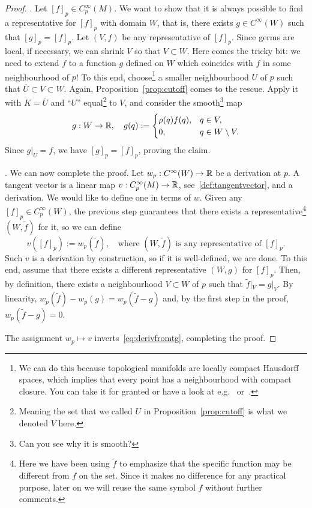 \begin{proof}
  .
  Let $[f]_p\in C_p^\infty(M)$.
  We want to show that it is always possible to find a representative for $[f]_p$ with domain $W$, that is, there exists $g\in C^\infty(W)$ such that $[g]_p = [f]_p$.
  Let $(V, f)$ be any representative of $[f]_p$.
  Since germs are local, if necessary, we can shrink $V$ so that $V\subset W$.
  Here comes the tricky bit: we need to extend $f$ to a function $g$ defined on $W$ which coincides with $f$ in some neighbourhood of $p$!
  To this end, choose\footnote{We can do this because topological manifolds are locally compact Hausdorff spaces, which implies that every point has a neighbourhood with compact closure. You can take it for granted or have a look at e.g.~\cite[Lemma 4.65]{book:lee:topology} or~\cite{book:munkres:topology}.} a smaller neighbourhood $U$ of $p$ such that $\overline{U}\subset V\subset W$.
  Again, Proposition~\ref{prop:cutoff} comes to the rescue. Apply it with $K=\overline{U}$ and ``$U$'' equal\footnote{Meaning the set that we called $U$ in Proposition~\ref{prop:cutoff} is what we denoted $V$ here.} to $V$, and consider the smooth\footnote{Can you see why it is smooth?} map
  \begin{equation}
    g:W\to\mathbb{R}, \quad
    g(q) := \begin{cases}
      \rho(q)f(q), & q\in V,             \\
      0,           & q \in W\setminus V.
    \end{cases}
  \end{equation}
  Since $g|_U = f$, we have $[g]_p = [f]_p$, proving the claim.

  . We can now complete the proof.
  Let $w_p:C^\infty(W) \to\mathbb{R}$ be a derivation at $p$.
  A tangent vector is a linear map $v:C_p^\infty(M)\to\mathbb{R}$, see~\eqref{def:tangentvector}, and a derivation.
  We would like to define one in terms of $w$.
Given any $[f]_p\in C_p^\infty(W)$, the previous step guarantees that there exists a representative\footnote{Here we have been using $\widetilde{f}$ to emphasize that the specific function may be different from $f$ on the set. Since it makes no difference for any practical purpose, later on we will reuse the same symbol $f$ without further comments.} $(W,\widetilde{f})$ for it, so we can define
  \begin{equation}
    v([f]_p) := w_p(\widetilde{f}), \quad\mbox{where $(W,\widetilde{f})$ is any representative of $[f]_p$}.
  \end{equation}
  Such $v$ is a derivation by construction, so if it is well-defined, we are done.
  To this end, assume that there exists a different representative $(W, g)$ for $[f]_p$.
  Then, by definition, there exists a neighbourhood $V\subset W$ of $p$ such that $\widetilde{f}|_V = g|_V$.
  By linearity, $w_p(\widetilde{f}) - w_p(g) = w_p(\widetilde{f}-g)$ and, by the first step in the proof, $w_p(\widetilde{f}-g) = 0$.

  The assignment $w_p\mapsto v$ inverts~\eqref{eq:derivfromtg}, completing the proof.
\end{proof}

